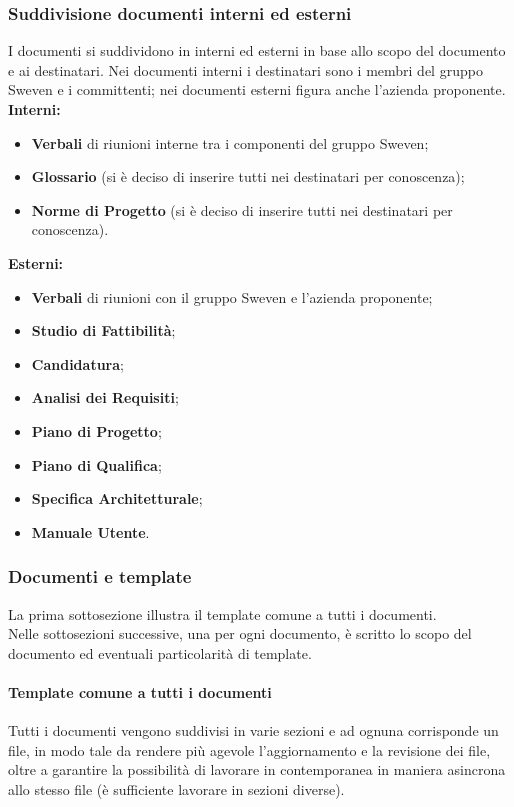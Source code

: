 \subsubsection{Suddivisione documenti interni ed esterni}
I documenti si suddividono in interni ed esterni in base allo scopo del documento e ai destinatari.
Nei documenti interni i destinatari sono i membri del gruppo Sweven e i committenti; nei documenti 
esterni figura anche l'azienda proponente. \newline
\textbf{Interni:}
\begin{itemize}
    \item \textbf{Verbali} di riunioni interne tra i componenti del gruppo Sweven;
    \item \textbf{Glossario} (si è deciso di inserire tutti nei destinatari per conoscenza);
    \item \textbf{Norme di Progetto} (si è deciso di inserire tutti nei destinatari per conoscenza).
\end{itemize}
\textbf{Esterni:}
\begin{itemize}
    \item \textbf{Verbali} di riunioni con il gruppo Sweven e l'azienda proponente;
    \item \textbf{Studio di Fattibilità};
    \item \textbf{Candidatura};
    \item \textbf{Analisi dei Requisiti};
    \item \textbf{Piano di Progetto};
    \item \textbf{Piano di Qualifica};
    \item \textbf{Specifica Architetturale};
    \item \textbf{Manuale Utente}.
\end{itemize}

\subsubsection{Documenti e template}
La prima sottosezione illustra il template comune a tutti i documenti.\\
Nelle sottosezioni successive, una per ogni documento, è scritto lo scopo 
del documento ed eventuali particolarità di template.
\paragraph{Template comune a tutti i documenti} \hfill \break
Tutti i documenti vengono suddivisi in varie sezioni e ad ognuna corrisponde 
un file, in modo tale da rendere più agevole l'aggiornamento e la revisione dei file, 
oltre a garantire la possibilità di lavorare in contemporanea in maniera 
asincrona allo stesso file (è sufficiente lavorare in sezioni diverse).

